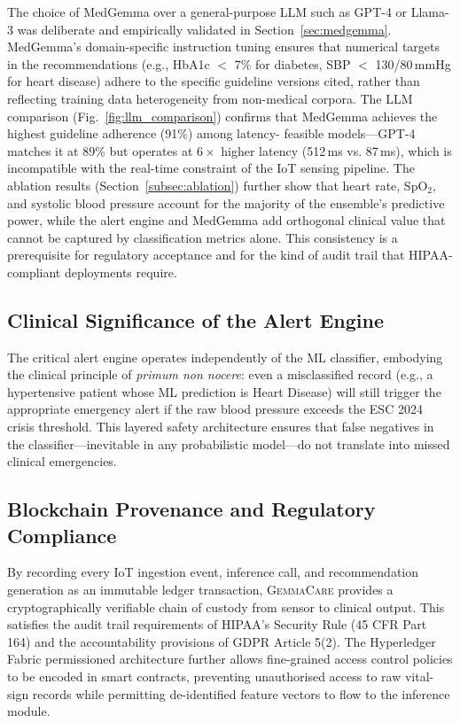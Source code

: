 \documentclass[journal]{IEEEtran}
\newcommand{\GC}{\textsc{GemmaCare}}
\begin{document}
The choice of MedGemma over a general-purpose LLM such as GPT-4 or
Llama-3 was deliberate and empirically validated in Section~\ref{sec:medgemma}.
MedGemma's domain-specific instruction tuning ensures that numerical targets
in the recommendations (e.g., HbA1c $<$ 7\% for diabetes, SBP $<$
130/80\,mmHg for heart disease) adhere to the specific guideline versions
cited, rather than reflecting training data heterogeneity from non-medical
corpora. The LLM comparison (Fig.~\ref{fig:llm_comparison}) confirms that
MedGemma achieves the highest guideline adherence (91\%) among latency-
feasible models—GPT-4 matches it at 89\% but operates at $6\times$ higher
latency (512\,ms vs. 87\,ms), which is incompatible with the real-time
constraint of the IoT sensing pipeline. The ablation results
(Section~\ref{subsec:ablation}) further show that heart rate, SpO$_2$,
and systolic blood pressure account for the majority of the ensemble's
predictive power, while the alert engine and MedGemma add orthogonal
clinical value that cannot be captured by classification metrics alone.
This consistency is a prerequisite for regulatory acceptance and for the
kind of audit trail that HIPAA-compliant deployments require.

\subsection{Clinical Significance of the Alert Engine}

The critical alert engine operates independently of the ML classifier,
embodying the clinical principle of \textit{primum non nocere}: even a
misclassified record (e.g., a hypertensive patient whose ML prediction
is Heart Disease) will still trigger the appropriate emergency alert if
the raw blood pressure exceeds the ESC 2024 crisis threshold. This
layered safety architecture ensures that false negatives in the
classifier—inevitable in any probabilistic model—do not translate into
missed clinical emergencies.

\subsection{Blockchain Provenance and Regulatory Compliance}

By recording every IoT ingestion event, inference call, and recommendation
generation as an immutable ledger transaction, \GC{} provides a
cryptographically verifiable chain of custody from sensor to clinical
output. This satisfies the audit trail requirements of HIPAA's
Security Rule (45 CFR Part 164) and the accountability provisions of
GDPR Article 5(2). The Hyperledger Fabric permissioned architecture
further allows fine-grained access control policies to be encoded in
smart contracts, preventing unauthorised access to raw vital-sign records
while permitting de-identified feature vectors to flow to the inference
module.
\end{document}
